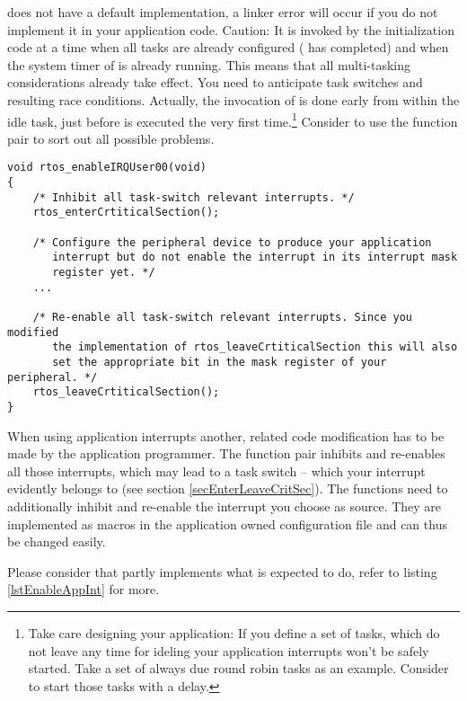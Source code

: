  does not have a default implementation, a
linker error will occur if you do not implement it in your application
code. Caution: It is invoked by the \rtos{} initialization code at a time
when all tasks are already configured ( has completed) and
when the system timer of \rtos{} is already running. This means that all
multi-tasking considerations already take effect. You need to anticipate
task switches and resulting race conditions. Actually, the invocation of
 is done early from within the idle task,
just before  is executed the very first time.\footnote{Take
care designing your application: If you define a set of tasks, which do
not leave any time for ideling your application interrupts won't be safely
started. Take a set of always due round robin tasks as an example.
Consider to start those tasks with a delay.} Consider to use the function
pair  to sort out all
possible problems.

\begin{lstlisting}[float, caption={Initialization of an application interrupt},
label=lstEnableAppInt, captionpos=b]
void rtos_enableIRQUser00(void)
{
    /* Inhibit all task-switch relevant interrupts. */
    rtos_enterCrtiticalSection();
    
    /* Configure the peripheral device to produce your application
       interrupt but do not enable the interrupt in its interrupt mask
       register yet. */
    ...
    
    /* Re-enable all task-switch relevant interrupts. Since you modified 
       the implementation of rtos_leaveCrtiticalSection this will also
       set the appropriate bit in the mask register of your peripheral. */
    rtos_leaveCrtiticalSection();
}
\end{lstlisting}

When using application interrupts another, related code modification has
to be made by the application programmer. The function pair
 inhibits and
re-enables all those interrupts, which may lead to a task switch -- which
your interrupt evidently belongs to (see section
\ref{secEnterLeaveCritSec}). The functions need to additionally inhibit
and re-enable the interrupt you choose as source. They are implemented as
macros in the application owned configuration file  and
can thus be changed easily.

Please consider that  partly
implements what  is expected to do, refer to
listing \ref{lstEnableAppInt} for more.


